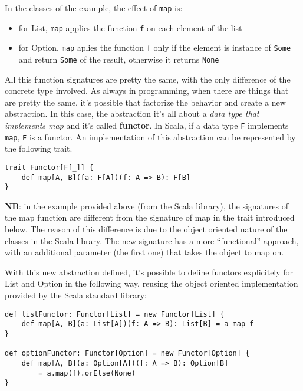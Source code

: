 In the classes of the example, the effect of \texttt{map} is:

\begin{itemize}
\itemsep1pt\parskip0pt
\item
  for List, \texttt{map} applies the function \texttt{f} on each element
  of the list
\item
  for Option, \texttt{map} aplies the function \texttt{f} only if the
  element is instance of \texttt{Some} and return \texttt{Some} of the
  result, otherwise it returns \texttt{None}
\end{itemize}

All this function signatures are pretty the same, with the only
difference of the concrete type involved. As always in programming, when
there are things that are pretty the same, it's possible that factorize
the behavior and create a new abstraction. In this case, the abstraction
it's all about a \emph{data type that implements map} and it's called
\textbf{functor}. In Scala, if a data type \texttt{F} implements
\texttt{map}, \texttt{F} is a functor. An implementation of this
abstraction can be represented by the following trait.

\begin{verbatim}
trait Functor[F[_]] {
    def map[A, B](fa: F[A])(f: A => B): F[B]
}
\end{verbatim}

\textbf{NB}: in the example provided above (from the Scala library), the
signatures of the map function are different from the signature of map
in the trait introduced below. The reason of this difference is due to
the object oriented nature of the classes in the Scala library. The new
signature has a more ``functional'' approach, with an additional
parameter (the first one) that takes the object to map on.

With this new abstraction defined, it's possible to define functors
explicitely for List and Option in the following way, reusing the object
oriented implementation provided by the Scala standard library:

\begin{verbatim}
def listFunctor: Functor[List] = new Functor[List] {
    def map[A, B](a: List[A])(f: A => B): List[B] = a map f
}

def optionFunctor: Functor[Option] = new Functor[Option] {
    def map[A, B](a: Option[A])(f: A => B): Option[B] 
    	= a.map(f).orElse(None)
}
\end{verbatim}

